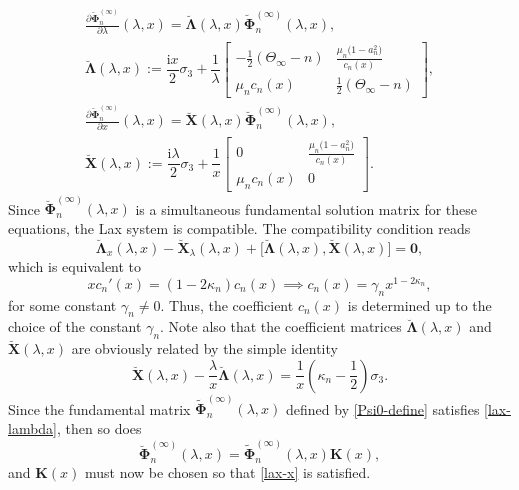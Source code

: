 \documentclass[11pt]{article}
\numberwithin{equation}{section}
\numberwithin{equation}{section}
\newcommand{\ii}{\mathrm{i}}
\newcommand{\para}[1]{\breve{#1}}
\begin{document}
\begin{gather}
 \frac{\partial\para{\boldsymbol \Phi}_{n}^{(\infty)}}{\partial\lambda}(\lambda,x) =\para{\boldsymbol\Lambda}(\lambda,x) \para{\boldsymbol \Phi}_n^{(\infty)}(\lambda,x),\nonumber\\
 \para{\mathbf{\Lambda}}(\lambda,x):=\dfrac{\ii x}{2} \sigma_3 + \dfrac{1}{\lambda}\begin{bmatrix} -\frac{1}{2}(\Theta_\infty -n) & \displaystyle \frac{\mu_n\big(1-a_n^2\big)}{c_n(x)} \\ \mu_n c_n(x) & \frac{1}{2}(\Theta_\infty-n) \end{bmatrix}, \label{lax-lambda} \\
 \frac{\partial\para{\boldsymbol \Phi}_{n}^{(\infty)}}{\partial x}(\lambda,x) =\para{\mathbf X}(\lambda,x) \para{\boldsymbol \Phi}_n^{(\infty)}(\lambda,x),\nonumber\\
 \para{\mathbf{X}}(\lambda,x):= \dfrac{\ii\lambda}{2} \sigma_3 + \dfrac{1}{x}\begin{bmatrix} 0 & \displaystyle \frac{\mu_n\big(1-a_n^2\big)}{c_n(x)} \\ \mu_n c_n(x) & 0 \end{bmatrix}. \label{lax-x}
\end{gather}
Since $\para{\boldsymbol\Phi}_n^{(\infty)}(\lambda,x)$ is a simultaneous fundamental solution matrix for these equations, the Lax system is compatible. The compatibility condition reads
\begin{equation*}
 \para{\boldsymbol\Lambda}_{x}(\lambda,x) - \para{\mathbf X}_{\lambda}(\lambda,x) + \big[\para{\boldsymbol{\Lambda}}(\lambda,x), \para{\mathbf X}(\lambda,x)\big] = \mathbf{0},
\end{equation*}
which is equivalent to
\begin{equation}
 xc_n'(x) = (1-2\kappa_n) c_n(x) \implies c_n(x) = \gamma_n x^{1-2\kappa_n},
 \label{c-of-x}
\end{equation}
for some constant $\gamma_n\neq 0$. Thus, the coefficient $c_n(x)$ is determined up to the choice of the constant $\gamma_n$. Note also that the coefficient matrices $\para{\boldsymbol{\Lambda}}(\lambda,x)$ and $\para{\mathbf{X}}(\lambda,x)$ are obviously related by the simple identity
\begin{equation}
 \para{\mathbf{X}}(\lambda,x)-\frac{\lambda}{x}\para{\boldsymbol\Lambda}(\lambda,x)=\frac{1}{x}\left(\kappa_n-\frac{1}{2}\right)\sigma_3.
 \label{XLambda-relation}
\end{equation}
\sloppy Since the fundamental matrix $\widetilde{\boldsymbol \Phi}_n^{(\infty)}(\lambda,x)$ defined by \eqref{Psi0-define} satisfies \eqref{lax-lambda}, then so does \[\para{\boldsymbol \Phi}_n^{(\infty)}(\lambda,x)=\widetilde{\boldsymbol\Phi}_n^{(\infty)}(\lambda,x) \mathbf K(x),\] and $\mathbf K(x)$ must now be chosen so that \eqref{lax-x} is satisfied.
\end{document}
